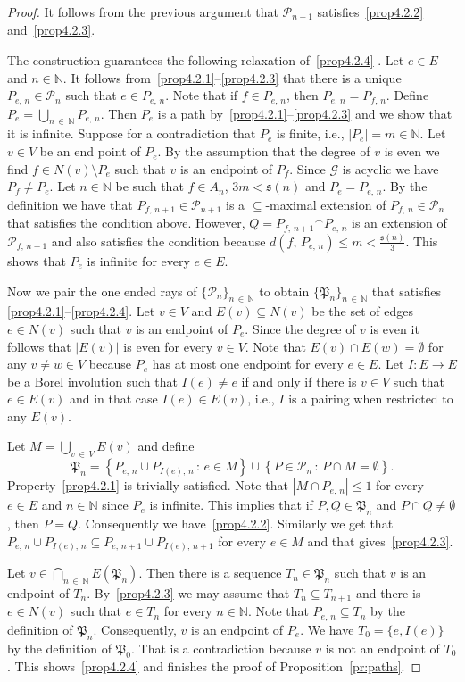 \documentclass[AHL,Unicode,longabstracts,published]{cedram}
\newcommand{\clG}{\mathcal{G}}
\newcommand{\clP}{\mathcal{P}}
\newcommand{\bbZ}{\mathbb{N}}
\newcommand{\frkP}{\mathfrak{P}}
\newcommand{\frks}{\mathfrak{s}}
\newcommand{\clG}{\mathcal{G}}
\begin{document}
\begin{proof}
It follows from the previous argument that $\clP_{n+1}$ satisfies~\eqref{prop4.2.2} and~\eqref{prop4.2.3}.

The construction guarantees the following relaxation of~\eqref{prop4.2.4} . Let $e\in E$ and $n\in \bbZ$. It follows from~\eqref{prop4.2.1}--\eqref{prop4.2.3} that there is a unique $P_{e,\,n}\in \clP_n$ such that $e\in P_{e,\,n}$. Note that if $f\in P_{e,\,n}$, then $P_{e,\,n}=P_{f,\,n}$. Define $P_e=\bigcup_{n\,\in\,\bbZ} P_{e,\,n}$. Then $P_e$ is a path by~\eqref{prop4.2.1}--\eqref{prop4.2.3} and we show that it is infinite. Suppose for a contradiction that $P_e$ is finite, i.e., $|P_e|=m\in \bbZ$. Let $v\in V$ be an end point of $P_e$. By the assumption that the degree of $v$ is even we find $f\in N(v)\setminus P_e$ such that $v$ is an endpoint of $P_f$. Since $\clG$ is acyclic we have $P_f\not=P_e$. Let $n\in \bbZ$ be such that $f\in A_n$, $3m<\frks(n)$ and $P_e=P_{e,\,n}$. By the definition we have that $P_{f,\,n+1}\in \clP_{n+1}$ is a $\subseteq$-maximal extension of $P_{f,\,n}\in \clP_n$ that satisfies the condition above. However, $Q={P_{f,\,n+1}}^\frown P_{e,\,n}$ is an extension of $\clP_{f,\,n+1}$ and also satisfies the condition because $d(f,\,P_{e,\,n})\le m<\frac{\frks(n)}{3}$. This shows that $P_e$ is infinite for every $e\in E$.

Now we pair the one ended rays of $\{\clP_n\}_{n\,\in\,\bbZ}$ to obtain $\{\frkP_n\}_{n\,\in\,\bbZ}$ that satisfies \eqref{prop4.2.1}--\eqref{prop4.2.4}. Let $v\in V$ and $E(v)\subseteq N(v)$ be the set of edges $e\in N(v)$ such that $v$ is an endpoint of $P_e$. Since the degree of $v$ is even it follows that $|E(v)|$ is even for every $v\in V$. Note that $E(v)\cap E(w)=\emptyset$ for any $v\not=w \in V$ because $P_e$ has at most one endpoint for every $e\in E$. Let $I:E\to E$ be a Borel involution such that $I(e)\not =e$ if and only if there is $v\in V$ such that $e\in E(v)$ and in that case $I(e)\in E(v)$, i.e., $I$ is a pairing when restricted to any $E(v)$.

Let $M=\bigcup_{v\,\in\,V} E(v)$ and define
\[
\frkP_n=\left\{P_{e,\,n}\cup P_{I(e),\,n}\,:\,e\in M\right\}\cup \left\{P\in \clP_n\,:\,P\cap M=\emptyset\right\}.
\]
Property~\eqref{prop4.2.1} is trivially satisfied. Note that $|M\cap P_{e,\,n}|\le 1$ for every $e\in E$ and $n\in \bbZ$ since $P_e$ is infinite. This implies that if $P,Q\in \frkP_n$ and $P\cap Q\not=\emptyset$, then $P=Q$. Consequently we have~\eqref{prop4.2.2}. Similarly we get that $P_{e,\,n}\cup P_{I(e),\,n}\subseteq P_{e,\,n+1}\cup P_{I(e),\,n+1}$ for every $e\in M$ and that gives~\eqref{prop4.2.3}.

Let $v\in \bigcap_{n\,\in\,\bbZ}E(\frkP_n)$. Then there is a sequence $T_n\in \frkP_n$ such that $v$ is an endpoint of $T_n$. By~\eqref{prop4.2.3} we may assume that $T_n\subseteq T_{n+1}$ and there is $e\in N(v)$ such that $e\in T_n$ for every $n\in \bbZ$. Note that $P_{e,\,n}\subseteq T_n$ by the definition of $\frkP_n$. Consequently, $v$ is an endpoint of $P_e$. We have $T_0=\{e,I(e)\}$ by the definition of $\frkP_0$. That is a contradiction because $v$ is not an endpoint of $T_0$. This shows~\eqref{prop4.2.4} and finishes the proof of Proposition~\ref{pr:paths}.
\end{proof}
\end{document}

